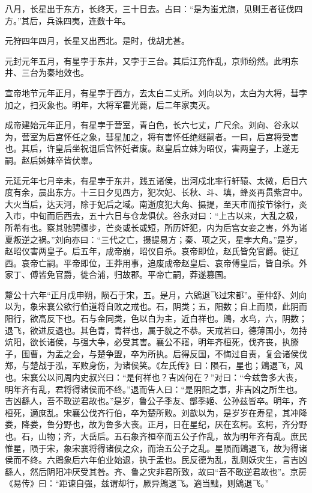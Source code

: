 \documentclass[]{article}
\begin{document}
八月，长星出于东方，长终天，三十日去。占曰：``是为蚩尤旗，见则王者征伐四方。''其后，兵诛四夷，连数十年。

元狩四年四月，长星又出西北。是时，伐胡尤甚。

元封元年五月，有星孛于东井，又孛于三台。其后江充作乱，京师纷然。此明东井、三台为秦地效也。

宣帝地节元年正月，有星孛于西方，去太白二丈所。刘向以为，太白为大将，彗孛加之，扫灭象也。明年，大将军霍光薨，后二年家夷灭。

成帝建始元年正月，有星孛于营室，青白色，长六七丈，广尺余。刘向、谷永以为，营室为后宫怀任之象，彗星加之，将有害怀任绝继嗣者。一曰，后宫将受害也。其后，许皇后坐祝诅后宫怀妊者废。赵皇后立妹为昭仪，害两皇子，上遂无嗣。赵后姊妹卒皆伏辜。

元延元年七月辛未，有星孛于东井，践五诸侯，出河戍北率行轩辕、太微，后日六度有余，晨出东方。十三日夕见西方，犯次妃、长秋、斗、填，蜂炎再贯紫宫中。大火当后，达天河，除于妃后之域。南逝度犯大角、摄提，至天市而按节徐行，炎入市，中旬而后西去，五十六日与仓龙俱伏。谷永对曰：``上古以来，大乱之极，所希有也。察其驰骋骤步，芒炎或长或短，所历奸犯，内为后宫女妾之害，外为诸夏叛逆之祸。''刘向亦曰：``三代之亡，摄提易方；秦、项之灭，星孛大角。''是岁，赵昭仪害两皇子。后五年，成帝崩，昭仪自杀。哀帝即位，赵氏皆免官爵。徙辽西。哀帝亡嗣。平帝即位，王莽用事，追废成帝赵皇后、哀帝傅皇后，皆自杀。外家丁、傅皆免官爵，徙合浦，归故郡。平帝亡嗣，莽遂篡国。

釐公十六年``正月戊申朔，陨石于宋，五。是月，六鶂退飞过宋都''。董仲舒、刘向以为，象宋襄公欲行伯道将自败之戒也。石，阴类；五，阳数；自上而陨，此阴而阳行，欲高反下也。石与金同类，色以白为主，近白祥也。鶂，水鸟，六，阴数；退飞，欲进反退也。其色青，青祥也，属于貌之不恭。天戒若曰，德薄国小，勿持炕阳，欲长诸侯，与强大争，必受其害。襄公不寤，明年齐桓死，伐齐丧，执滕子，围曹，为盂之会，与楚争盟，卒为所执。后得反国，不悔过自责，复会诸侯伐郑，与楚战于泓，军败身伤，为诸侯笑。《左氏传》曰：陨石，星也；鶂退飞，风也。宋襄公以问周内史叔兴曰：``是何祥也？吉凶何在？''对曰：``今兹鲁多大丧，明年齐有乱，君将得诸侯而不终。''退而告人曰：``是阴阳之事，非吉凶之所生也。吉凶繇人，吾不敢逆君故也。''是岁，鲁公子季友、鄫季姬、公孙兹皆卒。明年，齐桓死，適庶乱。宋襄公伐齐行伯，卒为楚所败。刘歆以为，是岁岁在寿星，其冲降娄，降娄，鲁分野也，故为鲁多大丧。正月，日在星纪，厌在玄枵。玄枵，齐分野也。石，山物；齐，大岳后。五石象齐桓卒而五公子作乱，故为明年齐有乱。庶民惟星，陨于宋，象宋襄将得诸侯之众，而治五公子之乱。星陨而鶂退飞，故为得诸侯而不终。六鶂象后六年伯业始退，执于盂也。民反德为乱，乱则妖灾生，言吉凶繇人，然后阴阳冲厌受其咎。齐、鲁之灾非君所致，故曰``吾不敢逆君故也''。京房《易传》曰：``距谏自强，兹谓却行，厥异鶂退飞。適当黜，则鶂退飞。''
\end{document}
